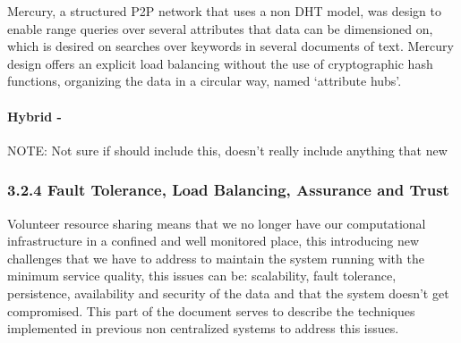 \documentclass{./llncs2e/llncs}
\begin{document}
Mercury\cite{Bharambe}, a structured P2P network that uses a non DHT model, was design to enable range queries over several attributes that data can be dimensioned on, which is desired on searches over keywords in several documents of text. Mercury design offers an explicit load balancing without the use of cryptographic hash functions, organizing the data in a circular way, named `attribute hubs'.


\paragraph{\textbf{Hybrid -}} %
\label{par:Hybrid}

NOTE: Not sure if should include this, doesn't really include anything that new






\subsubsection{3.2.4 Fault Tolerance, Load Balancing, Assurance and Trust}

Volunteer resource sharing means that we no longer have our computational infrastructure in a confined and well monitored place, this introducing new challenges that we have to address \cite{Koloniari2005} to maintain the system running with the minimum service quality, this issues can be: scalability, fault tolerance, persistence, availability and security\cite{Wallach} of the data and that the system doesn't get compromised. This part of the document serves to describe the techniques implemented in previous non centralized systems to address this issues.
\end{document}
